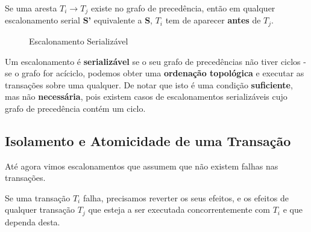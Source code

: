 \documentclass[oneside]{book}
\theoremstyle{definition}
\begin{document}
Se uma aresta $T_i \rightarrow T_j$ existe no grafo de precedência, então em qualquer escalonamento serial \textbf{S'} equivalente a \textbf{S}, $T_i$ tem de aparecer \textbf{antes} de $T_j$.

\begin{figure}[H]%
    \centering
    \qquad
    \caption{Escalonamento Serializável}%
    \label{fig:example}%
\end{figure}

Um escalonamento é \textbf{serializável} se o seu grafo de precedências não tiver ciclos - se o grafo for acíciclo, podemos obter uma \textbf{ordenação topológica} e executar as transações sobre uma qualquer. De notar que isto é uma condição \textbf{suficiente}, mas não \textbf{necessária}, pois existem casos de escalonamentos serializáveis cujo grafo de precedência contém um ciclo.

\subsection{Isolamento e Atomicidade de uma Transação}
Até agora vimos escalonamentos que assumem que não existem falhas nas transações.

Se uma transação $T_i$ falha, precisamos reverter os seus efeitos, e os efeitos de qualquer transação $T_j$ que esteja a ser executada concorrentemente com $T_i$ e que dependa desta.
\end{document}
